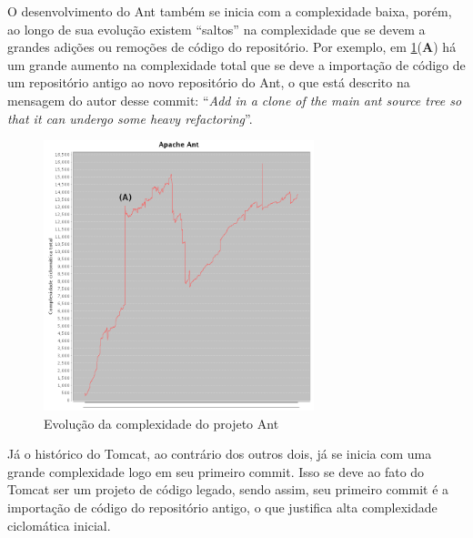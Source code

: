 \documentclass[a4paper, 12pt, twoside]{book}
\begin{document}
        O desenvolvimento do Ant também se inicia com a complexidade baixa, porém, ao longo de sua evolução existem ``saltos'' na complexidade que se devem a grandes adições ou remoções de código do repositório. Por exemplo, em \ref{fig:cc-ant}(\textbf{A}) há um grande aumento na complexidade total que se deve a importação de código de um repositório antigo ao novo repositório do Ant, o que está descrito na mensagem  do autor desse commit: ``\textit{Add in a clone of the main ant source tree so that it can undergo some heavy refactoring}''.

        \begin{figure}[ht]
            \centering
            \includegraphics[width=0.7\textwidth]{img/graficos/ant.png}
            \caption{Evolução da complexidade do projeto Ant}
            \label{fig:cc-ant}
        \end{figure}

        Já o histórico do Tomcat, ao contrário dos outros dois, já se inicia com uma grande complexidade logo em seu primeiro commit. Isso se deve ao fato do Tomcat ser um projeto de código legado, sendo assim, seu primeiro commit é a importação de código do repositório antigo, o que justifica alta complexidade ciclomática inicial.
\end{document}
